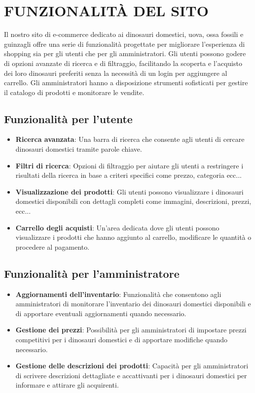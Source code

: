 \section{FUNZIONALITÀ DEL SITO}
Il nostro sito di e-commerce dedicato ai dinosauri domestici, uova, ossa fossili e guinzagli offre una serie di funzionalità progettate per migliorare l'esperienza di shopping sia per gli utenti che per gli amministratori. Gli utenti possono godere di opzioni avanzate di ricerca e di filtraggio, facilitando la scoperta e l'acquisto dei loro dinosauri preferiti senza la necessità di un login per aggiungere al carrello. Gli amministratori hanno a disposizione strumenti sofisticati per gestire il catalogo di prodotti e monitorare le vendite.

\subsection{Funzionalità per l'utente}
\begin{itemize}
    \item \textbf{Ricerca avanzata}: Una barra di ricerca che consente agli utenti di cercare dinosauri domestici tramite parole chiave.
    \item \textbf{Filtri di ricerca}: Opzioni di filtraggio per aiutare gli utenti a restringere i risultati della ricerca in base a criteri specifici come prezzo, categoria ecc...
    \item \textbf{Visualizzazione dei prodotti}: Gli utenti possono visualizzare i dinosauri domestici disponibili con dettagli completi come immagini, descrizioni, prezzi, ecc...
    \item \textbf{Carrello degli acquisti}: Un'area dedicata dove gli utenti possono visualizzare i prodotti che hanno aggiunto al carrello, modificare le quantità o procedere al pagamento.
\end{itemize}

\subsection{Funzionalità per l'amministratore}
\begin{itemize}
    \item \textbf{Aggiornamenti dell'inventario}: Funzionalità che consentono agli amministratori di monitorare l'inventario dei dinosauri domestici disponibili e di apportare eventuali aggiornamenti quando necessario.
    \item \textbf{Gestione dei prezzi}: Possibilità per gli amministratori di impostare prezzi competitivi per i dinosauri domestici e di apportare modifiche quando necessario.
    \item \textbf{Gestione delle descrizioni dei prodotti}: Capacità per gli amministratori di scrivere descrizioni dettagliate e accattivanti per i dinosauri domestici per informare e attirare gli acquirenti.
\end{itemize}

